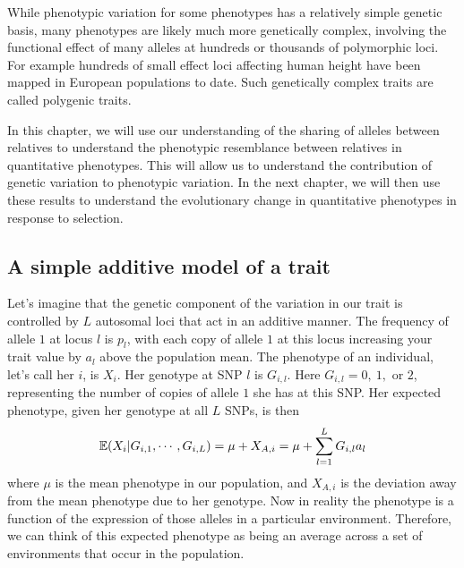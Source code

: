 While phenotypic variation for some phenotypes has a relatively simple genetic basis, many phenotypes are likely much more genetically complex, involving the functional effect of many alleles at hundreds or thousands of polymorphic loci. For example hundreds of small effect loci affecting human height have been mapped in European populations to date. Such genetically complex traits are called polygenic traits. 

In this chapter, we will use our understanding of the sharing of alleles between relatives to understand the phenotypic resemblance between relatives in
quantitative phenotypes. This will allow us to understand the contribution of genetic variation to phenotypic variation. In the next chapter, we will then use these results to understand the evolutionary change in quantitative phenotypes in response to selection. \\

\subsection{A simple additive model of a trait}
Let's imagine that the genetic component of the variation in our trait
is controlled by $L$ autosomal loci that act in an additive
manner. 
The frequency of allele $1$ at locus $l$ is $p_l$, with each copy of allele $1$ at this locus increasing your trait value by $a_l$ above the population mean.
The phenotype of an individual, let's call her $i$, is $X_i$.
Her genotype at SNP $l$ is
$G_{i,l}$. Here $G_{i,l}=0,~1,$ or $2$,  representing the number of copies of allele $1$ she
has at this SNP. Her expected phenotype, given her genotype at all $L$ SNPs, is then
\begin{equation}
\mathbb{E} (X_i | G_{i,1},\cdots,G_{i,L}) =\mu + X_{A,i} = \mu+\sum_{l=1}^L G_{i,l} a_{l} \label{pheno_geno}
\end{equation}
where $\mu$ is the mean phenotype in our population, and $X_{A,i}$ is
the deviation away from the mean phenotype due to her genotype. Now in reality the phenotype is a function of the
expression of those alleles in a particular environment. Therefore, we
can think of this expected phenotype as being an average across a set
of environments that occur in the population. \\



